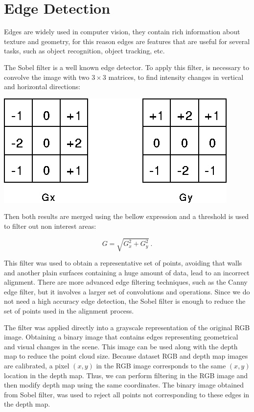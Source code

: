 \section{Edge Detection}

Edges are widely used in computer vision, they contain rich information about texture 
and geometry, for this reason edges are features that are useful for several tasks, 
such as object recognition, object tracking, etc.


The Sobel filter is a well known edge detector. To apply this filter, is necessary to 
convolve the image with two $3\times3$ matrices, to find intensity changes in vertical and 
horizontal directions:

\begin{center}
\includegraphics[scale=0.35]{images/sobel}
\end{center}

Then both results are merged using the bellow expression and a threshold is used to filter out non interest areas:

\begin{equation}
G = \sqrt{G_x^2+ G_y^2}\ .
\label{eq:sobelGrad}
\end{equation}

This filter was used to obtain a representative set of points, avoiding that walls and another 
plain surfaces containing a huge amount of data, lead to an incorrect alignment.
There are more advanced edge filtering techniques, such as the Canny edge filter, but it involves 
a larger set of convolutions and operations. Since we do not need a high accuracy edge detection, the Sobel 
filter is enough to reduce the set of points used in the alignment process. 

The filter was applied directly into a grayscale representation of the original RGB image. Obtaining a binary image 
that contains edges representing geometrical and visual changes in the scene. 
This image can be used along with the depth map to reduce the point cloud size. Because dataset RGB and depth map images are 
calibrated, a pixel $(x,y)$ in the RGB image corresponds to the same $(x,y)$ location in the depth map. Thus, we can perform filtering 
in the RGB image and then modify depth map using the same coordinates. The binary image obtained from Sobel filter, was used 
to reject all points not corresponding
to these edges in the depth map. 


